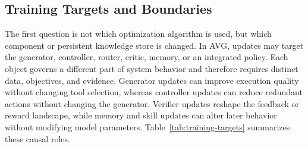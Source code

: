 \subsection{Training Targets and Boundaries}
\label{subsec:training-targets}

The first question is not which optimization algorithm is used, but which component or persistent knowledge store is changed. In AVG, updates may target the generator, controller, router, critic, memory, or an integrated policy. Each object governs a different part of system behavior and therefore requires distinct data, objectives, and evidence. Generator updates can improve execution quality without changing tool selection, whereas controller updates can reduce redundant actions without changing the generator. Verifier updates reshape the feedback or reward landscape, while memory and skill updates can alter later behavior without modifying model parameters. Table~\ref{tab:training-targets} summarizes these causal roles.

